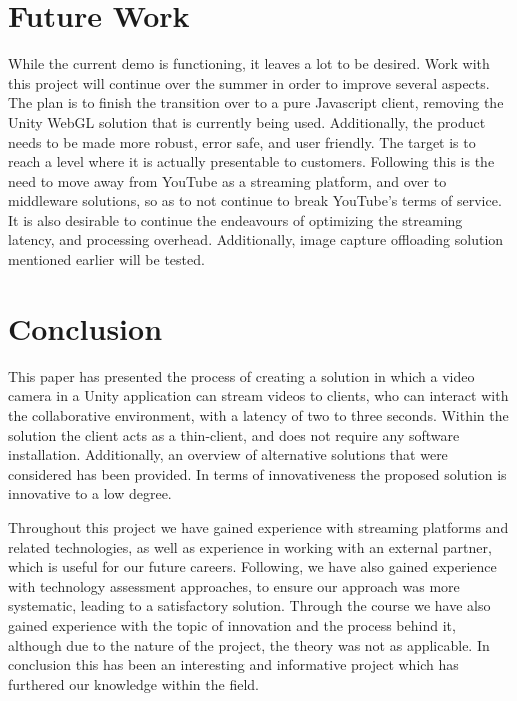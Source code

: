 \section{Future Work}
While the current demo is functioning, it leaves a lot to be desired. Work with this project will continue over the summer in order to improve several aspects. The plan is to finish the transition over to a pure Javascript client, removing the Unity WebGL solution that is currently being used. Additionally, the product needs to be made more robust, error safe, and user friendly. The target is to reach a level where it is actually presentable to customers.
Following this is the need to move away from YouTube as a streaming platform, and over to middleware solutions, so as to not continue to break YouTube's terms of service.
It is also desirable to continue the endeavours of optimizing the streaming latency, and processing overhead. Additionally, image capture offloading solution mentioned earlier will be tested.

\section{Conclusion}
This paper has presented the process of creating a solution in which a video camera in a Unity application can stream videos to clients, who can interact with the collaborative environment, with a latency of two to three seconds. Within the solution the client acts as a thin-client, and does not require any software installation. Additionally, an overview of alternative solutions that were considered has been provided. In terms of innovativeness the proposed solution is innovative to a low degree.

Throughout this project we have gained experience with streaming platforms and related technologies, as well as experience in working with an external partner, which is useful for our future careers. Following, we have also gained experience with technology assessment approaches, to ensure our approach was more systematic, leading to a satisfactory solution. Through the course we have also gained experience with the topic of innovation and the process behind it, although due to the nature of the project, the theory was not as applicable.
In conclusion this has been an interesting and informative project which has furthered our knowledge within the field.




        